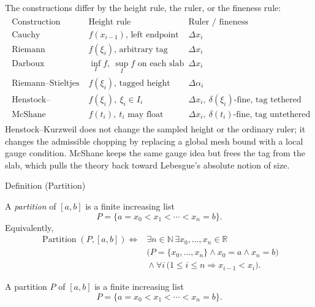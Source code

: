 \begin{remark*}[Interpretation]
The constructions differ by the height rule, the ruler, or the fineness rule:
\[
\begin{aligned}
\begin{array}{c|c|c}
\text{Construction} & \text{Height rule} & \text{Ruler / fineness}\\
\hline
\text{Cauchy} & f(x_{i-1})\text{, left endpoint} & \Delta x_i\\
\text{Riemann} & f(\xi_i)\text{, arbitrary tag} & \Delta x_i\\
\text{Darboux} & \inf_I f,\ \sup_I f\text{ on each slab} & \Delta x_i\\
\text{Riemann--Stieltjes} & f(\xi_i)\text{, tagged height} & \Delta\alpha_i\\
\text{Henstock--Kurzweil} & f(\xi_i),\ \xi_i\in I_i &
\Delta x_i,\ \delta(\xi_i)\text{-fine, tag tethered}\\
\text{McShane} & f(t_i),\ t_i\text{ may float} &
\Delta x_i,\ \delta(t_i)\text{-fine, tag untethered}
\end{array}
\end{aligned}
\]
Henstock--Kurzweil does not change the sampled height or the ordinary ruler;
it changes the admissible chopping by replacing a global mesh bound with a
local gauge condition. McShane keeps the same gauge idea but frees the tag
from the slab, which pulls the theory back toward Lebesgue's absolute notion
of size.
\end{remark*}

\begin{definitionbox}{Definition (Partition)}
\begin{definition}
\label{def:integration-partition}
A \emph{partition} of \([a,b]\) is a finite increasing list
\[
  P=\{a=x_0<x_1<\cdots<x_n=b\}.
\]
Equivalently,
\[
\begin{aligned}
\operatorname{Partition}(P,[a,b])\Longleftrightarrow{}
&\exists n\in\mathbb N\,\exists x_0,\ldots,x_n\in\mathbb R\\
&\bigl(P=\{x_0,\ldots,x_n\}\wedge x_0=a\wedge x_n=b\bigr)\\
&{}\wedge \forall i\,\bigl(1\le i\le n\Rightarrow x_{i-1}<x_i\bigr).
\end{aligned}
\]
\end{definition}
\end{definitionbox}

\begin{remark*}
A partition \(P\) of \([a,b]\) is a finite increasing list
\[
  P=\{a=x_0<x_1<\cdots<x_n=b\}.
\]
\end{remark*}

